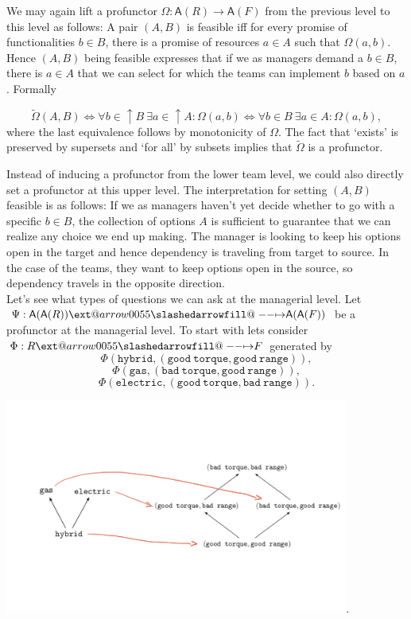 \documentclass[12pt]{article}
\makeatletter
\theoremstyle{definition}
\theoremstyle{plain}
\theoremstyle{plain}
\theoremstyle{plain}
\theoremstyle{plain}
\theoremstyle{remark}
\theoremstyle{remark}
\newcommand{\ac}{\mathsf{A}}
\def\slashedarrowfill@#1#2#3#4#5{%
	$\m@th\thickmuskip0mu\medmuskip\thickmuskip\thinmuskip\thickmuskip
	\relax#5#1\mkern-7mu%
	\cleaders\hbox{$#5\mkern-2mu#2\mkern-2mu$}\hfill
	\mathclap{#3}\mathclap{#2}%
	\cleaders\hbox{$#5\mkern-2mu#2\mkern-2mu$}\hfill
	\mkern-7mu#4$%
}
\def\rightslashedarrowfill@{%
	\slashedarrowfill@\relbar\relbar\mapstochar\rightarrow}
\newcommand\xslashedrightarrow[2][]{%
	\ext@arrow 0055{\rightslashedarrowfill@}{#1}{#2}}
\makeatother
\begin{document}
We may again lift a profunctor $\Omega: \ac(R) \rightarrow \ac(F)$ from the previous level to this level as follows: A pair $(A,B)$ is feasible iff for every promise of functionalities $b \in B$, there is a promise of resources $a \in A$ such that $\Omega(a,b)$. Hence $(A,B)$ being feasible expresses that if we as managers demand a $b \in B$, there is $a \in A$ that we can select for which the teams can implement $b$ based on $a$. Formally

$$\tilde\Omega(A,B) \iff \forall b \in \uparrow B \: \exists a \in  \uparrow A: \Omega(a,b) \iff \forall b \in B\: \exists a \in  A: \Omega(a,b),$$
where the last equivalence follows by monotonicity of $\Omega$. The fact that `exists' is preserved by supersets and `for all' by subsets implies that $\tilde\Omega$ is a profunctor. 

Instead of inducing a profunctor from the lower team level, we could also directly set a profunctor at this upper level. The interpretation for setting $(A,B)$ feasible is as follows: If we as managers haven't yet decide whether to go with a specific $b \in B$, the collection of options $A$ is sufficient to guarantee that we can realize any choice we end up making. The manager is looking to keep his options open in the target and hence dependency is traveling from target to source. In the case of the teams, they want to keep options open in the source, so dependency travels in the opposite direction.\\

Let's see what types of questions we can ask at the managerial level. Let $\Psi: \ac(\ac(R)) \xslashedrightarrow{} \ac(\ac(F))$ be a profunctor at the managerial level. To start with lets consider $\Phi: R \xslashedrightarrow{} F$ generated by 
$$\Phi(\mathtt{hybrid},\mathtt{(good\ torque, good\ range)}),$$
$$\Phi(\mathtt{gas},\mathtt{(bad\ torque, good\ range)}),$$
$$\Phi(\mathtt{electric},\mathtt{(good\ torque, bad\ range)}).$$
\begin{center}
	\includegraphics[height=200pt]{section6/6.1/resource_level.jpeg}.
\end{center}
\end{document}
